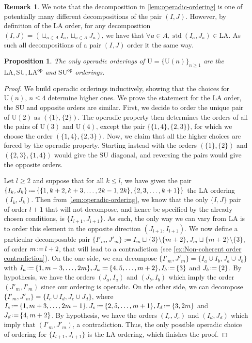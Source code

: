 \documentclass{amsart}
\newtheorem{proposition}[theorem]{Proposition}
\theoremstyle{definition}
\newtheorem{remark}[theorem]{Remark}
\newcommand{\Un}{\mathrm{U}} %
\newcommand{\eqdef}{\mbox{\,\raisebox{0.2ex}{\scriptsize\ensuremath{\mathrm:}}\ensuremath{=}\,}} %
\DeclareMathOperator{\std}{std}
\newcommand{\SU}{\mathrm{SU}}
\newcommand{\LA}{\mathrm{LA}}
\newcommand{\op}{\mathrm{op}}
\begin{document}
\begin{remark}
We note that the decomposition in \cref{lem:operadic-ordering} is one of potentially many different decompositions of the pair $(I,J)$. 
However, by definition of the $\LA$ order, for any decomposition $(I,J) = (\sqcup_{a\in A} I_a, \sqcup_{a \in A} J_a)$, we have that $\forall a \in A, \std(I_a, J_a) \in \LA$.
As such all decompositions of a pair $(I,J)$ order it the same way.
\end{remark}

\begin{proposition}
\label{prop:operadic-ordering}
The only operadic orderings of $\Un=\{\Un(n)\}_{n\geq 1}$ are the $\LA,\SU,\LA^{\op}$ and $\SU^{\op}$ orderings.
\end{proposition}

\begin{proof}
We build operadic orderings inductively, showing that the choices for $\Un(n)$, $n\leq 4$ determine higher ones. 
We prove the statement for the $\LA$ order, the $\SU$ and opposite orders are similar. 
First, we decide to order the unique pair of $\Un(2)$ as $(\{1\},\{2\})$.
The operadic property then determines the orders of all the pairs of $\Un(3)$ and $\Un(4)$, except the pair $\{\{1,4\},\{2,3\}\}$, for which we choose the order $(\{1,4\},\{2,3\})$.
Now, we claim that all the higher choices are forced by the operadic property. 
Starting instead with the orders $(\{1\},\{2\})$ and $(\{2,3\},\{1,4\})$ would give the $\SU$ diagonal, and reversing the pairs would give the opposite orders. 

Let $l\geq 2$ and suppose that for all $k\leq l$, we have given the pair $\{I_k,J_k\} \eqdef \{\{1,k+2,k+3,\dots,2k-1,2k\},\{2,3,\dots,k+1\}\}$ the $\LA$ ordering $(I_k,J_k)$.
Then from \cref{lem:operadic-ordering}, we know that the only $\{I,J\}$ pair of order $l+1$ that will not decompose, and hence be specified by the already chosen conditions, is $\{I_{l+1},J_{l+1}\}$.
As such, the only way we can vary from $\LA$ is to order this element in the opposite direction $(J_{l+1},I_{l+1})$. 
We now define a particular decomposable pair $\{I'_m,J'_m\}:= I_m \sqcup \{3\} \setminus \{m+2\}, J_m \sqcup \{m+2\} \setminus \{3\}$, of order $m \eqdef l+2$, that will lead to a contradiction (see \cref{ex:Non-coherent order contradiction}).
On the one side, we can decompose $\{I'_m,J'_m\} = \{I_a \cup I_b, J_a \cup J_b\}$ with $I_a \eqdef  \{1,m+3,\dots,2m\}, J_a \eqdef  \{4,5,\dots,m+2\}, I_b \eqdef \{3\}$ and $J_b \eqdef  \{2\}$. 
By hypothesis, we have the orders $(J_a,I_a)$ and $(J_b,I_b)$ which imply the order $(J'_m,I'_m)$ since our ordering is operadic. 
On the other side, we can decompose $\{I'_m,J'_m\} = \{I_c \cup I_d, J_c \cup J_d\}$, where $I_c \eqdef  \{1,m+3,\dots,  2m-1\}, J_c \eqdef \{2,5,\dots,m+1\}, I_d \eqdef \{3, 2m\}$ and $J_d \eqdef  \{4, m+2\}$.
By hypothesis, we have the orders $(I_c,J_c)$ and $(I_d,J_d)$ which imply that $(I'_m,J'_m)$, a contradiction.
Thus, the only possible operadic choice of ordering for $\{I_{l+1},J_{l+1}\}$ is the $\LA$ ordering, which finishes the proof. 
\end{proof}
\end{document}
